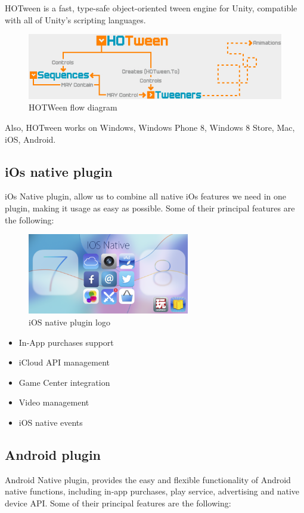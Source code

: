 HOTween is a fast, type-safe object-oriented tween engine for Unity, compatible with all of Unity's scripting languages.~\cite{hotween1}

\begin{figure}[h]
\centering
\includegraphics[width=400pt]{graphics/enabling-tech/hotween_arch.jpg}
\caption{HOTWeen flow diagram}
\label{fig:hotween_arch}
\end{figure}

Also, HOTween works on Windows, Windows Phone 8, Windows 8 Store, Mac, iOS, Android.

\subsection{iOs native plugin}
\label{subsec:iosplugin}
iOs Native plugin, allow us to combine all native iOs features we need in one plugin, making it usage as easy as possible. Some of their principal features are the following:~\cite{iosnative1}

\begin{figure}[h]
\centering
\includegraphics[width=200pt]{graphics/enabling-tech/iOsnative_logo.png}
\caption{iOS native plugin logo}
\label{fig:iOsnative_logo}
\end{figure}

\begin{itemize}
\item In-App purchases support
\item iCloud API management
\item Game Center integration
\item Video management
\item iOS native events
\end{itemize}

\subsection{Android plugin}
\label{subsec:androidplugin}
Android Native plugin, provides the easy and  flexible functionality of Android native functions, including in-app purchases, play service, advertising and native device API. Some of their principal features are the following:~\cite{androidnative1}

